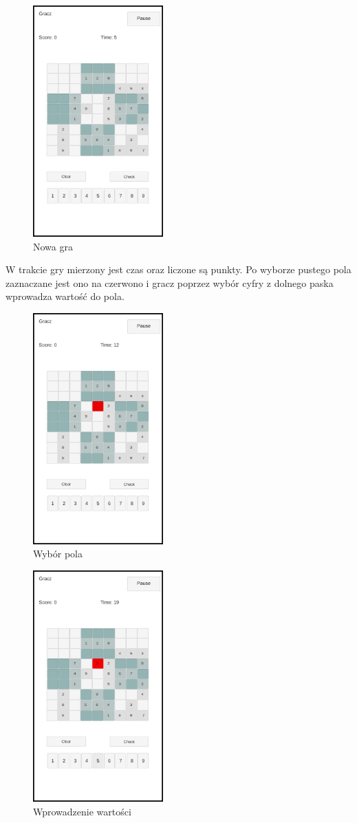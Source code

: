 \documentclass[a4paper, 11pt]{article}
\begin{document}
\begin{figure}[H]
	\centering
	\includegraphics[width=5cm]{zrzuty/4.png}
	\caption{Nowa gra}
	\label{fig:nowagra}
\end{figure}
W trakcie gry mierzony jest czas oraz liczone są punkty. Po wyborze pustego pola zaznaczane jest ono na czerwono i gracz poprzez wybór cyfry z dolnego paska wprowadza wartość do pola.
\begin{figure}[H]
	\centering
	\includegraphics[width=5cm]{zrzuty/5.png}
	\caption{Wybór pola}
	\label{fig:wybor_pola}
\end{figure}
\begin{figure}[H]
	\centering
	\includegraphics[width=5cm]{zrzuty/6.png}
	\caption{Wprowadzenie wartości}
	\label{fig:wprowadzenie_wartosci}
\end{figure}
\end{document}
